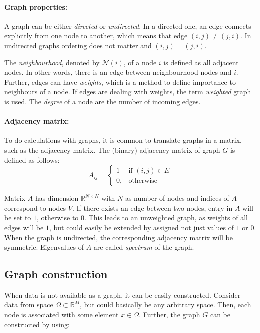 \paragraph{Graph properties:}
A graph can be either \textit{directed} or \textit{undirected}. 
In a directed one, an edge connects explicitly from one node to another, which means that edge $(i, j) \neq (j, i)$. 
In undirected graphs ordering does not matter and $(i, j) = (j, i)$.

The \textit{neighbourhood}, denoted by $\mathcal{N}(i)$, of a node $i$  is defined as all adjacent nodes.
In other words, there is an edge between neighbourhood nodes and $i$. 
Further, edges can have \textit{weights}, which is a method to define importance to neighbours of a node.
If edges are dealing with weights, the term \textit{weighted} graph is used.
The \textit{degree} of a node are the number of incoming edges.

\paragraph{Adjacency matrix:}
To do calculations with graphs, it is common to translate graphs in a matrix, 
such as the adjacency matrix.
The (binary) adjacency matrix of graph $G$ is defined as follows:
\begin{equation}
    \label{eg:AdjacencyMatrix}
    A_{ij} =    
    \begin{cases}
        1  & \text{if } (i, j) \in E \\
        0, & \text{otherwise}
    \end{cases}
\end{equation}

Matrix $A$ has dimension $\mathbb{R}^{N \times N}$ with $N$ as number of nodes
and indices of $A$ correspond to nodes $V$.
If there exists an edge between two nodes, entry in $A$ will be set to $1$, otherwise to $0$.
This leads to an unweighted graph, as weights of all edges will be $1$, 
but could easily be extended by assigned not just values of $1$ or $0$. 
When the graph is undirected, the corresponding adjacency matrix will be symmetric. 
Eigenvalues of $A$ are called \textit{spectrum} of the graph.


\subsection{Graph construction}
\label{sec:graphConstruction}
When data is not available as a graph, it can be easily constructed.
Consider data from space $\Omega \subset \mathbb{R}^M $, but could basically be any arbitrary space.
Then, each node is associated with some element $x \in \Omega$.
Further, the graph $G$ can be constructed by using:

